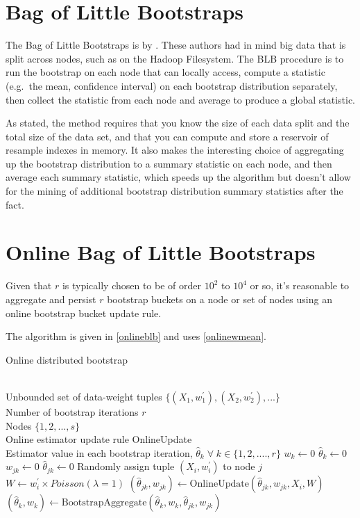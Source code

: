 \documentclass{article}
\begin{document}
\section{Bag of Little Bootstraps}

The Bag of Little Bootstraps is by \cite{bib:blb}. These authors had in mind
big data that is split across nodes, such as on the Hadoop Filesystem. The BLB
procedure is to run the bootstrap on each node that can locally access,
compute a statistic (e.g.\ the mean, confidence interval) on each bootstrap
distribution separately, then collect the statistic from each node and average
to produce a global statistic.

As stated, the method requires that you know the size of each data split and
the total size of the data set, and that you can compute and store a reservoir
of resample indexes in memory. It also makes the interesting choice of
aggregating up the bootstrap distribution to a summary statistic on each node,
and then average each summary statistic, which speeds up the algorithm but
doesn't allow for the mining of additional bootstrap distribution summary
statistics after the fact.

\section{Online Bag of Little Bootstraps}

Given that $r$ is typically chosen to be of order $10^2$ to $10^4$ or so, it's
reasonable to aggregate and persist $r$ bootstrap buckets on a node or set of
nodes using an online bootstrap bucket update rule.

The algorithm is given in \ref{onlineblb} and uses \ref{onlinewmean}.

\begin{algorithm}
\caption{Online distributed bootstrap}
\label{onlineblb}
\begin{algorithmic}[1]
\Require \\
Unbounded set of data-weight tuples $\{(X_1,w^{\prime}_1), (X_2,w^{\prime}_2), ...\}$\\
Number of bootstrap iterations $r$\\
Nodes $\{1,2, ..., s\}$\\
Online estimator update rule OnlineUpdate
\Ensure \\
Estimator value in each bootstrap iteration, $\hat\theta_{k}\;\forall \; k\in \{1, 2, ...., r\}$
\State $w_{k} \gets 0$
\State $\hat\theta_{k} \gets 0$
\State $w_{jk} \gets 0$
\State $\hat\theta_{jk} \gets 0$
\EndFor
\EndFor
{}
\State Randomly assign tuple $(X_i,w^{\prime}_i)$ to node $j$
\State $W \gets w^{\prime}_i \times Poisson(\lambda = 1)$
\State $(\hat\theta_{jk}, w_{jk}) \gets \mathrm{OnlineUpdate}(\hat\theta_{jk}, w_{jk}, X_i, W)$
\State $(\hat\theta_{k}, w_{k}) \gets \mathrm{BootstrapAggregate}(\hat\theta_{k}, w_{k},\hat\theta_{jk}, w_{jk})$
\EndFor
\EndFor
\EndProcedure
\end{algorithmic}
\end{algorithm}
\end{document}
